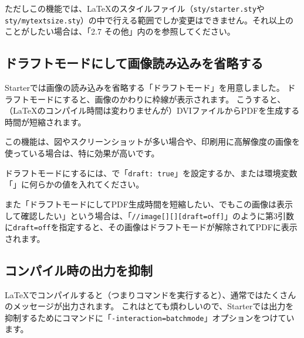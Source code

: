 ただしこの機能では、\LaTeX{}のスタイルファイル（\texttt{sty/starter.sty}や\texttt{sty/mytextsize.sty}）の中で行える範囲でしか変更はできません。それ以上のことがしたい場合は、「2.7 その他」内のを参照してください。

\subsection*{ドラフトモードにして画像読み込みを省略する}
\label{sec:1-3-3}
\label{8v2z5}

Starterでは画像の読み込みを省略する「ドラフトモード」を用意しました。
ドラフトモードにすると、画像のかわりに枠線が表示されます。
こうすると、（\LaTeX{}のコンパイル時間は変わりませんが）DVIファイルからPDFを生成する時間が短縮されます。

この機能は、図やスクリーンショットが多い場合や、印刷用に高解像度の画像を使っている場合は、特に効果が高いです。

ドラフトモードにするには、で「\texttt{draft: true}」を設定するか、または環境変数「」に何らかの値を入れてください。

\label{}
\begin{starterterminal}\end{starterterminal}

また「ドラフトモードにしてPDF生成時間を短縮したい、でもこの画像は表示して確認したい」という場合は、「\texttt{//image[][][draft=off]}」のように第3引数に\texttt{draft=off}を指定すると、その画像はドラフトモードが解除されてPDFに表示されます。

\subsection*{コンパイル時の出力を抑制}
\label{sec:1-3-4}

\LaTeX{}でコンパイルすると（つまりコマンドを実行すると）、通常ではたくさんのメッセージが出力されます。
これはとても煩わしいので、Starterでは出力を抑制するためにコマンドに「\texttt{{-}interaction=batchmode}」オプションをつけています。

